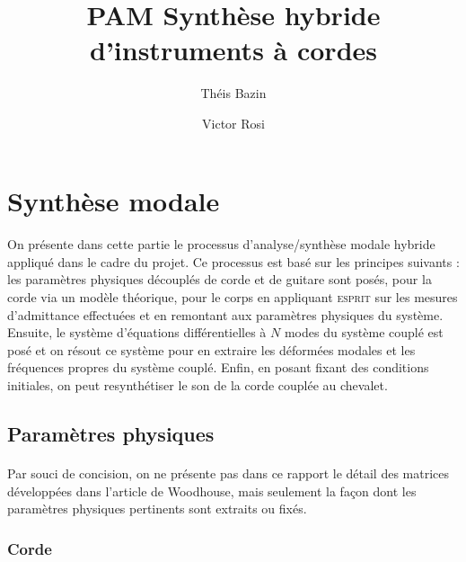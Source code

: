 \documentclass[a4paper,10pt]{article}
\title{PAM Synthèse hybride d'instruments à cordes}
\author{Th\'{e}is Bazin \and Victor Rosi}
\begin{document}

% 

\section{Synthèse modale}

\paragraph{}
  On présente dans cette partie le processus d'analyse/synthèse modale hybride
appliqué dans le cadre du projet. Ce processus est basé sur les principes
suivants : les paramètres physiques découplés de corde et de guitare sont
posés, pour la corde via un modèle théorique, pour le corps en appliquant
\textsc{esprit} sur les mesures d'admittance effectuées et en remontant aux
paramètres physiques du système.
  Ensuite, le système d'équations différentielles à \( N \) modes du système
couplé est posé et on résout ce système pour en extraire les déformées modales
et les fréquences propres du système couplé. Enfin, en posant fixant des
conditions initiales, on peut resynthétiser le son de la corde couplée au
chevalet.

\subsection{Paramètres physiques}

\paragraph{}
Par souci de concision, on ne présente pas dans ce rapport le détail des
matrices développées dans l'article de Woodhouse, mais seulement la façon dont
les paramètres physiques pertinents sont extraits ou fixés.

\subsubsection{Corde}
  \paragraph{}
\end{document}
